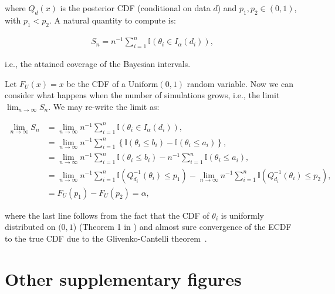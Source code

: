 \documentclass[oneside]{article}
\begin{document}
\noindent where $Q_{d}(x)$ is the posterior CDF (conditional on data $d$) and $p_1, p_2 \in (0,1)$, with $p_1 < p_2$.
A natural quantity to compute is:

\begin{align*}
S_n = n^{-1}\sum_{i=1}^n \mathbb{I}\left(\theta_i \in I_{\alpha}\left(d_i\right) \right),
\end{align*}

\noindent i.e., the attained coverage of the Bayesian intervals.

Let $F_U(x) = x$ be the CDF of a $\operatorname{Uniform(0, 1)}$ random variable. 
Now we can consider what happens when the number of simulations grows, i.e., the limit $\lim_{n \to \infty} S_n$.
We may re-write the limit as:

\begin{align*}
\lim_{n \to \infty} S_n &= \lim_{n \to \infty} n^{-1}\sum_{i=1}^n \mathbb{I}\left(\theta_i \in I_{\alpha}\left(d_i\right) \right),\\
&=  \lim_{n \to \infty} n^{-1}\sum_{i=1}^n \left\{ \mathbb{I}\left(\theta_i \leq b_i \right) - \mathbb{I}\left(\theta_i \leq a_i \right) \right\},\\
&=  \lim_{n \to \infty} n^{-1}\sum_{i=1}^n \mathbb{I}\left(\theta_i \leq b_i \right) -  n^{-1}\sum_{i=1}^n\mathbb{I}\left(\theta_i \leq a_i \right),\\
&=  \lim_{n \to \infty} n^{-1}\sum_{i=1}^n \mathbb{I}\left(Q_{d_i}^{-1}\left(\theta_i\right) \leq p_1 \right) -   \lim_{n \to \infty} n^{-1}\sum_{i=1}^n\mathbb{I}\left(Q_{d_i}^{-1}\left(\theta_i\right) \leq p_2 \right),\\
&= F_U(p_1) - F_U(p_2) = \alpha,
\end{align*}

\noindent where the last line follows from the fact that the CDF of $\theta_i$ is uniformly distributed on $(0, 1$) (Theorem 1 in \citealp{Cook06}) and almost sure convergence of the ECDF to the true CDF due to the  Glivenko-Cantelli theorem~\cite[page 275]{Billingsley1986}.

\newpage
\section{Other supplementary figures}
\label{appendix::sec:supp_figures}
\end{document}
